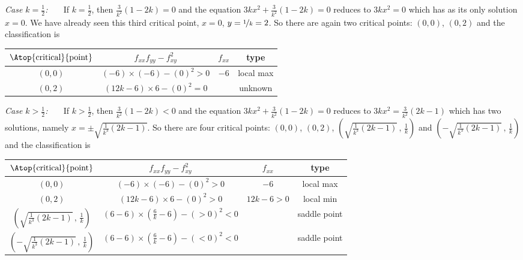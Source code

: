 \begin{solution}
\emph{Case $k=\frac{1}{2}$:\ \ \ }
If $k=\frac{1}{2}$, then $\frac{3}{k^2}(1-2k)=0$ and the equation 
$3kx^2+\frac{3}{k^2}(1-2k)=0$ reduces to $3kx^2=0$ which has as its only solution $x=0$. We have already seen this third critical point, $x=0$, $y=\nicefrac{1}{k}=2$. 
So there are again two critical points: $(0,0)$, $(0,2)$ and 
the classification is
\begin{center}
\renewcommand{\arraystretch}{1.3}
     \begin{tabular}{|c|c|c|c|}
     \hline
    $\Atop{\text{critical}}{\text{point}}$  & $f_{xx}f_{yy}-f_{xy}^2$ & 
                                                          $f_{xx}$ & type \\    
    \hline
     $(0,0)$  & $(-6)\times(-6)-(0)^2> 0$ & $-6$   & local max  \\ \hline
     $(0,2)$  & $(12k-6)\times 6-(0)^2=0$ &   & unknown \\  \hline
     \end{tabular}
\renewcommand{\arraystretch}{1.0}
\end{center}

\emph{Case $k>\frac{1}{2}$:\ \ \ }
If $k>\frac{1}{2}$, then $\frac{3}{k^2}(1-2k)<0$ and the equation 
$3kx^2+\frac{3}{k^2}(1-2k)=0$ reduces to $3kx^2=\frac{3}{k^2}(2k-1)$ 
which has two solutions, namely $x=\pm\sqrt{\frac{1}{k^3}(2k-1)}$.  
So there are four critical points: $(0,0)$, $(0,2)$,
$\left(\sqrt{\frac{1}{k^3}(2k-1)}\,,\,\frac{1}{k}\right)$ and 
$\left(-\sqrt{\frac{1}{k^3}(2k-1)}\,,\,\frac{1}{k}\right)$ and 
the classification is
\begin{center}
\renewcommand{\arraystretch}{1.3}
     \begin{tabular}{|c|c|c|c|}
     \hline
    $\Atop{\text{critical}}{\text{point}}$  & $f_{xx}f_{yy}-f_{xy}^2$ & 
                                                          $f_{xx}$ & type \\    
    \hline
     $(0,0)$  & $(-6)\times(-6)-(0)^2> 0$ & $-6$   & local max  \\ \hline
     $(0,2)$  & $(12k-6)\times 6-(0)^2>0$ & $12k-6>0$ & local min \\  \hline
     $\left(\sqrt{\frac{1}{k^3}(2k-1)}\,,\,\frac{1}{k}\right)$  
               & $(6-6)\times (\frac{6}{k}-6)-(> 0)^2<0$ &   & saddle point \\  \hline
     $\left(-\sqrt{\frac{1}{k^3}(2k-1)}\,,\,\frac{1}{k}\right)$  
               & $(6-6)\times (\frac{6}{k}-6)-(< 0)^2<0$ &   & saddle point \\  \hline
     \end{tabular}
\renewcommand{\arraystretch}{1.0}
\end{center}
\end{solution}


